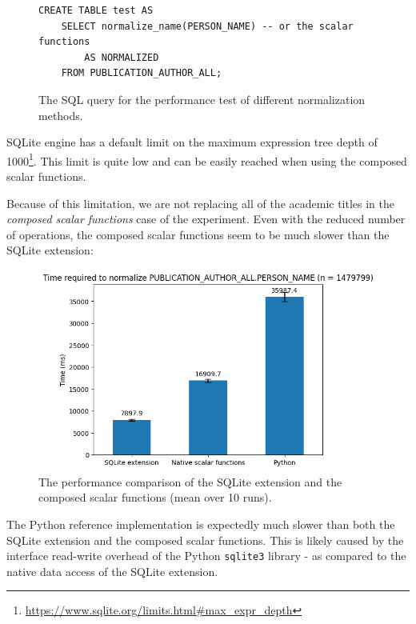 \begin{figure}[!ht]
\begin{verbatim}
CREATE TABLE test AS 
    SELECT normalize_name(PERSON_NAME) -- or the scalar functions
        AS NORMALIZED 
    FROM PUBLICATION_AUTHOR_ALL;
\end{verbatim}
\captionsetup{width=.9\linewidth}
\caption{The SQL query for the performance test of different normalization methods.}

\end{figure}

SQLite engine has a default limit on the maximum expression tree depth of 1000\footnote{\url{https://www.sqlite.org/limits.html\#max_expr_depth}}.
This limit is quite low and can be easily reached when using the composed scalar functions.

Because of this limitation, we are not replacing all of the academic titles in the \textit{composed scalar functions} case of the experiment.
Even with the reduced number of operations, the composed scalar functions seem to be much slower than the SQLite extension:

\begin{figure}[ht!]
    \captionsetup{width=.9\linewidth}
    \includegraphics[width=\textwidth]{../img/sqlite_vs_native_scalar_functions.png}
    \centering
    \caption{The performance comparison of the SQLite extension and the composed scalar functions (mean over 10 runs).}
\end{figure}

The Python reference implementation is expectedly much slower than both the SQLite extension and the composed scalar functions.
This is likely caused by the interface read-write overhead of the Python \texttt{sqlite3} library - as compared to the native data access of the SQLite extension.

